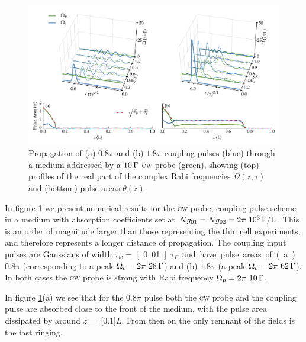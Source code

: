     \begin{figure}[h]
    \includegraphics[width=\linewidth]{figs/06_simultons/mb_vee_sit_plot_08pi_18pi_fig1.pdf}
    \caption{
    Propagation of (a) $0.8 \pi$ and (b) $1.8 \pi$ coupling pulses (blue)
    through a medium addressed by a $\unit[10]{\Gamma}$ \textsc{cw} probe
    (green), showing (top) profiles of the real part of the complex Rabi
    frequencies $\Omega(z, \tau)$ and (bottom) pulse areas $\theta(z)$.
    }
    \label{fig:pulse_cw_08pi_18pi}
    \end{figure}

    In figure \ref{fig:pulse_cw_08pi_18pi} we present numerical results for the
    \textsc{cw} probe, coupling pulse scheme in a medium with absorption
    coefficients set at $N g_{01} = N g_{02} = \unit[2\pi~10^3]{\Gamma/L}$. This
    is an order of magnitude larger than those representing the thin cell
    experiments, and therefore represents a longer distance of propagation. The
    coupling input pulses are Gaussians of width $\tau_w = $
    \unit[0.01]{$\tau_\Gamma$} and have pulse areas of (a) $0.8 \pi$
    (corresponding to a peak $\Omega_c = \unit[2\pi~28]{\Gamma}$) and (b) $1.8
    \pi$ (a peak $\Omega_c = \unit[2\pi~62]{\Gamma}$). In both cases the
    \textsc{cw} probe is strong with Rabi frequency $\Omega_p =
    \unit[2\pi~10]{\Gamma}$.

    In figure \ref{fig:pulse_cw_08pi_18pi}(a) we see that for the $0.8 \pi$ pulse both
    the \textsc{cw} probe and the coupling pulse are absorbed close to the front
    of the medium, with the pulse area dissipated by around $z = $
    \unit[$0.1$]{$L$}. From then on the only remnant of the fields is the fast
    ringing.

